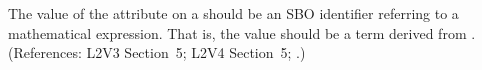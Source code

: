 The value of the  attribute on a \Delay should be an SBO
identifier referring to a mathematical expression.  That is, the value
should be a term derived from \sbomathformula.  (References: 
L2V3 Section~5; L2V4 Section~5; .)

